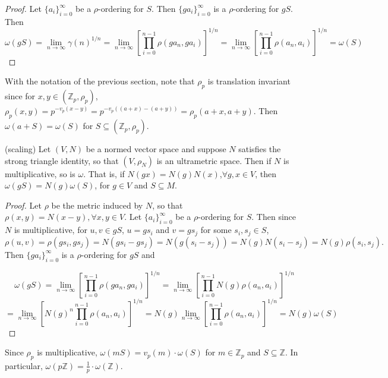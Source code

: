 \begin{proof}
	Let $\{a_i\}_{i=0}^\infty$ be a $\rho$-ordering for $S$. Then $\{ga_i\}_{i=0}^\infty$ is a $\rho$-ordering for $gS$. Then $$\omega(gS) = \lim_{n\to\infty} \gamma(n)^{1/n} =  \lim_{n\to\infty} [\prod_{i=0}^{n-1} \rho(ga_n,ga_i)]^{1/n} = \lim_{n\to\infty} [\prod_{i=0}^{n-1} \rho(a_n,a_i)]^{1/n}	 = \omega(S)$$
\end{proof}	

\begin{example}
	With the notation of the previous section, note that $\rho_p$ is translation invariant since for $x,y \in (\mathbb{Z}_p, \rho_p)$, $\rho_p(x,y) = p^{-v_p(x-y)} = p^{-v_p((a+x)-(a+y))} = \rho_p(a+x,a+y)$. Then $\omega(a+S) = \omega(S)$ for $S \subseteq (\mathbb{Z}_p, \rho_p)$.
\end{example}

\begin{proposition}
(scaling)	Let $(V, N)$ be a normed vector space and suppose $N$ satisfies the strong triangle identity, so that $(V,\rho_N)$ is an ultrametric space. Then if $N$ is multiplicative, so is $\omega$. That is, if $N(gx)=N(g)N(x)$,$\forall g,x \in V$, then $\omega(gS) = N(g)  \omega(S)$, for $g \in V$ and $S \subseteq M$. 
\end{proposition}

\begin{proof}
	Let $\rho$ be the metric induced by $N$, so that $\rho(x,y) = N(x-y), \forall x,y \in V$. Let $\{a_i\}_{i=0}^\infty$ be a $\rho$-ordering for $S$. Then since $N$ is multiplicative, for $u, v \in gS$, $u=gs_i$ and $v=gs_j$ for some $s_i, s_j \in S$,  $$\rho(u, v) = \rho(gs_i, gs_j) =N(gs_i - gs_j) = N(g(s_i - s_j)) = N(g)N(s_i - s_j) = N(g)\rho(s_i,s_j).$$
	Then $\{ga_i\}_{i=0}^\infty$ is a $\rho$-ordering for $gS$ and 
	
	$$\omega(gS) = \lim_{n\to\infty} [\prod_{i=0}^{n-1} \rho(ga_n,ga_i)]^{1/n} 
	= \lim_{n\to\infty} [\prod_{i=0}^{n-1} N(g)\rho(a_n,a_i)]^{1/n} $$
	$$= \lim_{n\to\infty} [N(g)^n\prod_{i=0}^{n-1} \rho(a_n,a_i)]^{1/n} = N(g) \lim_{n\to\infty} [\prod_{i=0}^{n-1} \rho(a_n,a_i)]^{1/n} = N(g) \omega(S)$$
\end{proof}


\begin{example}
	Since $\rho_p$ is multiplicative, $\omega(mS) = v_p(m)\cdot \omega(S)$ for $m \in \mathbb{Z}_p$ and $S \subseteq \mathbb{Z}$. In particular, $\omega(p\mathbb{Z}) = \frac{1}{p}\cdot \omega(\mathbb{Z})$. %
\end{example}

